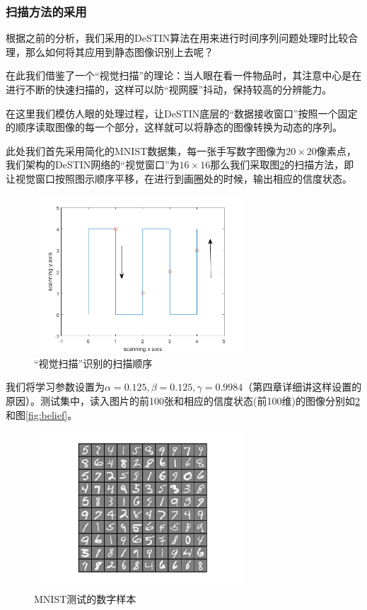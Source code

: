 \subsubsection{扫描方法的采用}
根据之前的分析，我们采用的DeSTIN算法在用来进行时间序列问题处理时比较合理，那么如何将其应用到静态图像识别上去呢？

在此我们借鉴了一个“视觉扫描”的理论：当人眼在看一件物品时，其注意中心是在进行不断的快速扫描的，这样可以防“视网膜”抖动，保持较高的分辨能力\cite{Deubel1996Postsaccadic}。

在这里我们模仿人眼的处理过程，让DeSTIN底层的“数据接收窗口”按照一个固定的顺序读取图像的每一个部分，这样就可以将静态的图像转换为动态的序列\cite{Karnowski2012Deep}。

此处我们首先采用简化的MNIST数据集，每一张手写数字图像为$20\times 20$像素点，我们架构的DeSTIN网络的“视觉窗口”为$16\times 16$那么我们采取图\ref{fig:scanning}的扫描方法，即让视觉窗口按照图示顺序平移，在进行到画圈处的时候，输出相应的信度状态。

\begin{figure}[htbp]
   \centering
   \includegraphics[width=0.7\textwidth]{ScanningImage.png} %
   \caption{“视觉扫描”识别的扫描顺序}
   \label{fig:scanning}
\end{figure}

我们将学习参数设置为$\alpha = 0.125, \beta = 0.125, \gamma = 0.9984$（第四章详细讲这样设置的原因）。测试集中，读入图片的前100张和相应的信度状态(前100维)的图像分别如\ref{fig:scanning}和图\ref{fig:belief}。

\begin{figure}[htbp]
   \centering
   \includegraphics[width=0.7\textwidth]{MNISTSample.png} %
   \caption{MNIST测试的数字样本}
   \label{fig:scanning}
\end{figure}


